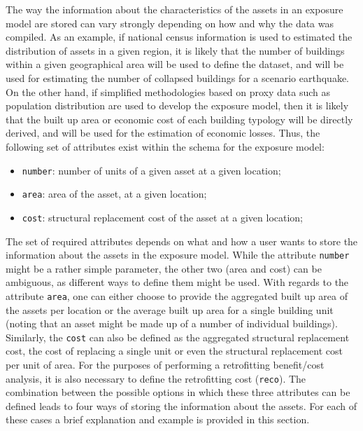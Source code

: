 The way the information about the characteristics of the \glspl{asset} in an \gls{exposure model} are stored can vary strongly depending on how and why the data was compiled. As an example, if national census information is used to estimated the distribution of assets in a given region, it is likely that the number of buildings within a given geographical area will be used to define the dataset, and will be used for estimating the number of collapsed buildings for a scenario earthquake. On the other hand, if simplified methodologies based on proxy data such as population distribution are used to develop the exposure model, then it is likely that the built up area or economic cost of each building typology will be directly derived, and will be used for the estimation of economic losses. Thus, the following set of attributes exist within the schema for the exposure model:

\begin{itemize}
\item  \Verb+number+: number of units of a given \gls{asset} at a given location;
\item  \Verb+area+: area of the \gls{asset}, at a given location;
\item  \Verb+cost+: structural replacement cost of the \gls{asset} at a given location;
\end{itemize}

The set of required attributes depends on what and how a user wants to store the information about the assets in the exposure model. While the attribute \Verb+number+ might be a rather simple parameter, the other two (area and cost) can be ambiguous, as different ways to define them might be used. With regards to the attribute \Verb+area+, one can either choose to provide the aggregated built up area of the \glspl{asset} per location or the average built up area for a single building unit (noting that an \gls{asset} might be made up of a number of individual buildings). Similarly, the \Verb+cost+ can also be defined as the aggregated structural replacement cost, the cost of replacing a single unit or even the structural replacement cost per unit of area. For the purposes of performing a retrofitting benefit/cost analysis, it is also necessary to define the retrofitting cost (\Verb+reco+). The combination between the possible options in which these three attributes can be defined leads to four ways of storing the information about the assets. For each of these cases a brief explanation and example is provided in this section.

